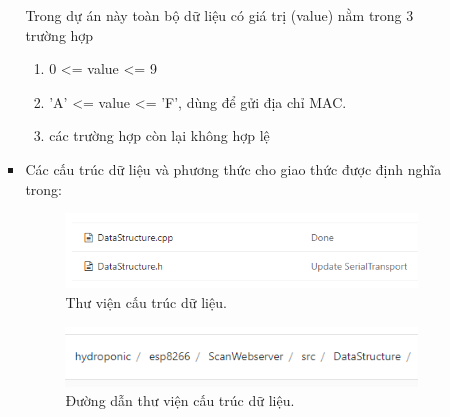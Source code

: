 \documentclass[a4paper,12pt,oneside]{article}
\begin{document}
\begin{enumerate}
\begin{enumerate}
\begin{itemize}
		\noindent Trong dự án này toàn bộ dữ liệu có giá trị (value) nằm trong 3 trường hợp
		\begin{enumerate}
		\item 0 <= value <= 9
		\item 'A' <= value <= 'F', dùng để gửi địa chỉ MAC.
		\item các trường hợp còn lại không hợp lệ
		\end{enumerate}
		
		\item Các cấu trúc dữ liệu và phương thức cho giao thức được định nghĩa trong: 
		
			\begin{figure}[H]
			\centering
			\includegraphics[scale=.7]{hinh/lib_datastructure.PNG}
			\caption{Thư viện cấu trúc dữ liệu.}
			\end{figure}
			
			\begin{figure}[H]
			\centering
			\includegraphics[scale=.7]{hinh/path_datastructure.PNG}
			\caption{Đường dẫn thư viện cấu trúc dữ liệu.}
			\end{figure}
		
		\end{itemize}
	\end{enumerate}
	

\end{enumerate}
\end{document}

